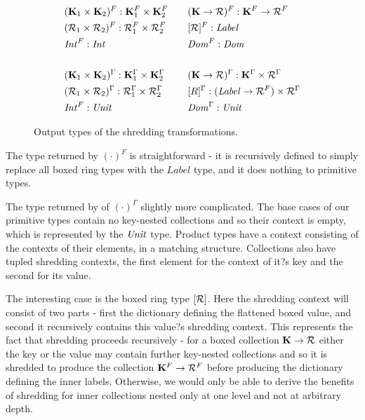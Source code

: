 {{{{\begin{figure}
\begin{equation*}
\begin{aligned}[c]
&(\mathbf{K}_1 \times \mathbf{K}_2)^F : \mathbf{K}_1^F \times \mathbf{K}_2^F \\
&(\mathcal{R}_1 \times \mathcal{R}_2)^F : \mathcal{R}_1^F \times \mathcal{R}_2^F \\
&\textrm{\textit{Int}}^F : \textrm{\textit{Int}} \\
\\
&(\mathbf{K}_1 \times \mathbf{K}_2)^\Gamma : \mathbf{K}_1^\Gamma \times \mathbf{K}_2^\Gamma \\
&(\mathcal{R}_1 \times \mathcal{R}_2)^\Gamma : \mathcal{R}_1^\Gamma \times \mathcal{R}_2^\Gamma \\
&\textrm{\textit{Int}}^F : \textrm{\textit{Unit}} \\
\end{aligned}
\qquad
\begin{aligned}[c]
&(\mathbf{K} \rightarrow \mathcal{R})^F : \mathbf{K}^F \rightarrow \mathcal{R}^F \\
&[\mathcal{R}]^F: \textrm{\textit{Label}} \\
&\textrm{\textit{Dom}}^F : \textrm{\textit{Dom}} \\
\\
&(\mathbf{K} \rightarrow \mathcal{R})^\Gamma : \mathbf{K}^\Gamma \times \mathcal{R}^\Gamma \\
&[R]^\Gamma : (\textrm{\textit{Label}} \rightarrow \mathcal{R}^F) \times \mathcal{R}^\Gamma \\
&\textrm{\textit{Dom}}^\Gamma : \textrm{\textit{Unit}} \\
\end{aligned}
\end{equation*}
\caption{Output types of the shredding transformations.}
\label{shreddingtypes}
\end{figure}

The type returned by $(\cdot)^F$ is straightforward - it is recursively defined to simply replace all boxed ring types with the $Label$ type, and it does nothing to primitive types.

The type returned by of $(\cdot)^\Gamma$ slightly more complicated. The base cases of our primitive types contain no key-nested collections and so their context is empty, which is represented by the $\textrm{\textit{Unit}}$ type. Product types have a context consisting of the contexts of their elements, in a matching structure. Collections also have tupled shredding contexts, the first element for the context of it?s key and the second for its value.

The interesting case is the boxed ring type $[\mathcal{R}]$. Here the shredding context will consist of two parts - first the dictionary defining the flattened boxed value, and second it recursively contains this value?s shredding context. This represents the fact that shredding proceeds recursively - for a boxed collection $\mathbf{K} \rightarrow \mathcal{R}$ either the key or the value may contain further key-nested collections and so it is shredded to produce the collection $\mathbf{K}^F \rightarrow \mathcal{R}^F$ before producing the dictionary defining the inner labels. Otherwise, we would only be able to derive the benefits of shredding for inner collections nested only at one level and not at arbitrary depth.

}}}}
